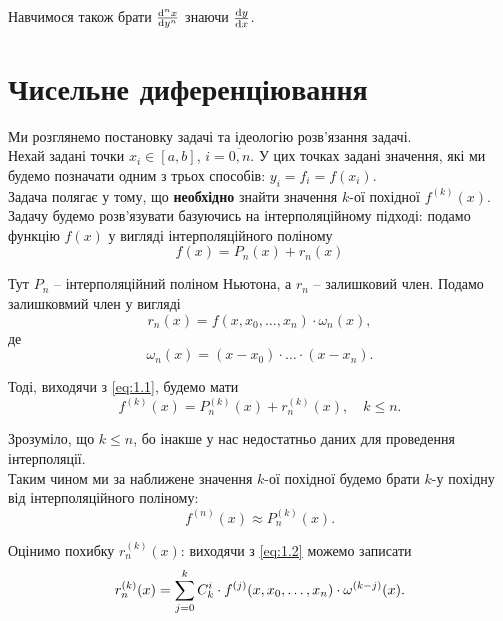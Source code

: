 Навчимося також брати $\frac{\mathop{}\!\mathrm{d}^n x}{\mathop{}\!\mathrm{d} y^n}$ знаючи $\frac{\mathop{}\!\mathrm{d} y}{\mathop{}\!\mathrm{d} x}$.

\section{Чисельне диференціювання}

Ми розглянемо постановку задачі та ідеологію розв'язання задачі. \\

Нехай задані точки $x_i \in [a, b]$, $i = \overline{0, n}$. У цих точках задані значення, які ми будемо позначати одним з трьох способів: $y_i = f_i = f(x_i)$.\\

Задача полягає у тому, що \textbf{необхідно} знайти значення $k$-ої похідної $f^{(k)}(x)$. \\

Задачу будемо розв'язувати базуючись на інтерполяційному підході: подамо функцію $f(x)$ у вигляді інтерполяційного поліному
\begin{equation}
	\label{eq:1.1}
	f(x) = P_n(x) + r_n(x)
\end{equation}

Тут $P_n$ -- інтерполяційний поліном Ньютона, а $r_n$ -- залишковий член. Подамо залишковмий член у вигляді
\begin{equation}
	\label{eq:1.2}
	r_n(x) = f(x, x_0, \ldots, x_n) \cdot \omega_n(x),
\end{equation}
де
\begin{equation}
	\label{eq:1.3}
	\omega_n(x) = (x - x_0) \cdot \ldots \cdot (x - x_n).
\end{equation}

Тоді, виходячи з \eqref{eq:1.1}, будемо мати
\begin{equation}
	\label{eq:1.4}
	f^{(k)}(x) = P_n^{(k)}(x) + r_n^{(k)}(x), \quad k \le n.
\end{equation}

Зрозуміло, що $k \le n$, бо інакше у нас недостатньо даних для проведення інтерполяції. \\

Таким чином ми за наближене значення $k$-ої похідної будемо брати $k$-у похідну від інтерполяційного поліному:
\begin{equation}
	\label{eq:1.5}
	f^{(n)}(x) \approx P_n^{(k)}(x).
\end{equation}

Оцінимо похибку $r_n^{(k)}(x)$: виходячи з \eqref{eq:1.2} можемо записати
\begin{equation}
	\label{eq:1.6}
	r_n^{(k)}(x) = \displaystyle\sum\limits_{j=0}^k C_k^i \cdot f^{(j)} (x, x_0, \ldots, x_n) \cdot \omega^{(k - j)}(x).
\end{equation}

